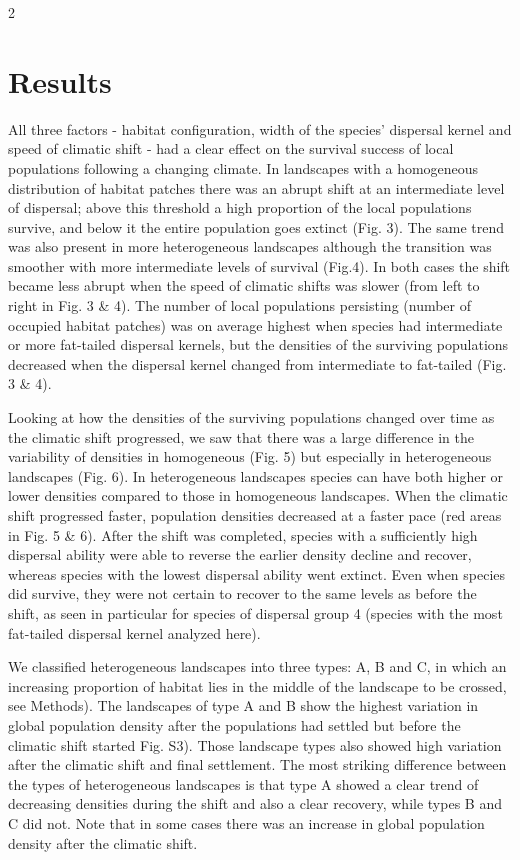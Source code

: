 \documentclass[12pt,pdftex]{article}
\begin{document}
\begin{spacing}{2}
\section*{Results}
All three factors - habitat configuration, width of the species’ dispersal kernel and speed of climatic shift - had a clear effect on the survival success of local populations following a changing climate. In landscapes with a homogeneous distribution of habitat patches there was an abrupt shift at an intermediate level of dispersal; above this threshold a high proportion of the local populations survive, and below it the entire population goes extinct (Fig. 3). The same trend was also present in more heterogeneous landscapes although the transition was smoother with more intermediate levels of survival (Fig.4). In both cases the shift became less abrupt when the speed of climatic shifts was slower (from left to right in Fig. 3 \& 4). The number of local populations persisting (number of occupied habitat patches) was on average highest when species had intermediate or more fat-tailed dispersal kernels, but the densities of the surviving populations decreased when the dispersal kernel changed from intermediate to fat-tailed (Fig. 3 \& 4). 


Looking at how the densities of the surviving populations changed over time as the climatic shift progressed, we saw that there was a large difference in the variability of densities in homogeneous (Fig. 5) but especially in heterogeneous landscapes (Fig. 6). In heterogeneous landscapes species can have both higher or lower densities compared to those in homogeneous landscapes. When the climatic shift progressed faster, population densities decreased at a faster pace (red areas in Fig. 5 \& 6). After the shift was completed, species with a sufficiently high dispersal ability were able to reverse the earlier density decline and recover, whereas species with the lowest dispersal ability went extinct. Even when species did survive, they were not certain to recover to the same levels as before the shift, as seen in particular for species of dispersal group 4 (species with the most fat-tailed dispersal kernel analyzed here).


We classified heterogeneous landscapes into three types: A, B and C, in which an increasing proportion of habitat lies in the middle of the landscape to be crossed, see Methods). The landscapes of type A and B show the highest variation in global population density after the populations had settled but before the climatic shift started Fig. S3). Those landscape types also showed high variation after the climatic shift and final settlement. The most striking difference between the types of heterogeneous landscapes is that type A showed a clear trend of decreasing densities during the shift and also a clear recovery, while types B and C did not. Note that in some cases there was an increase in global population density after the climatic shift.     


\end{spacing}
\end{document}
